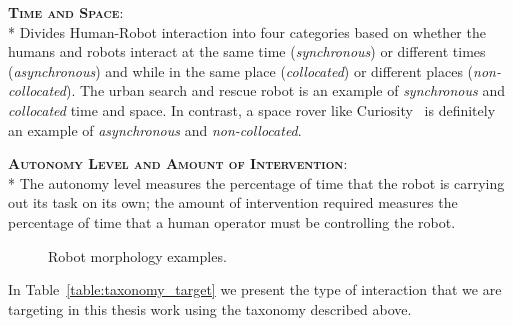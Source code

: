 {\bfseries \scshape Time and Space}:\\*
Divides Human-Robot interaction into four categories based on whether the humans and robots interact at the same time (\textit{synchronous}) or different times (\textit{asynchronous}) and while in the same place (\textit{collocated}) or different places (\textit{non-collocated}).
The urban search and rescue robot is an example of \textit{synchronous} and \textit{collocated} time and space. 
In contrast, a space rover like Curiosity~\cite{curiosity} is definitely an example of \textit{asynchronous} and \textit{non-collocated}.

{\bfseries \scshape Autonomy Level and Amount of Intervention}:\\*
The autonomy level measures the percentage of time that the robot is carrying out its task on its own; 
the amount of intervention required measures the percentage of time that a human operator must be controlling the robot.

\begin{figure}[tb]
    \centering
    \quad
    \quad
    \caption{Robot morphology examples.}\label{fig:robot_morphology}
\end{figure}

In Table~\ref{table:taxonomy_target} we present the type of interaction that we are targeting in this thesis work using the taxonomy described above.

